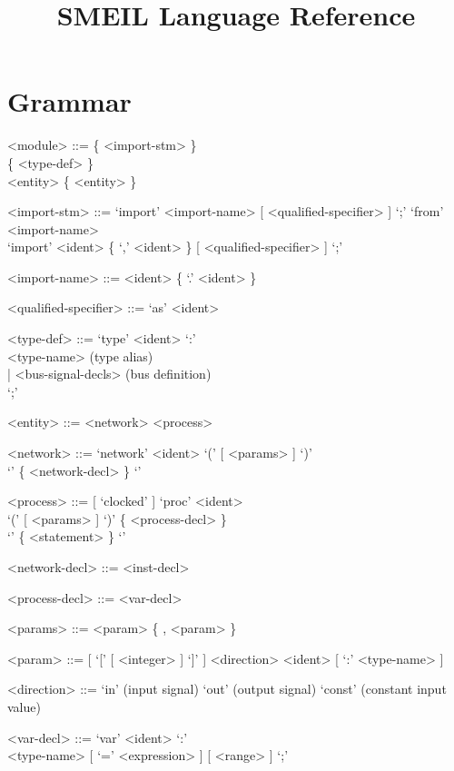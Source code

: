 \documentclass{article}
\title{SMEIL Language Reference}
\date{}
\begin{document}
\maketitle

\section*{Grammar}
\begin{grammar}
  <module> ::= \{ <import-stm> \} \\ \{ <type-def> \} \\ <entity> \{ <entity> \}

  <import-stm> ::= `import' <import-name> [ <qualified-specifier> ] `;'
  \alt `from' <import-name> \\ `import' <ident> \{ `,' <ident> \} [ <qualified-specifier> ]
  `;'

  <import-name> ::= <ident> \{ `.' <ident> \}

  <qualified-specifier> ::= `as' <ident>

  <type-def> ::= `type' <ident> `:' \\
    <type-name> (type alias) \\
    | <bus-signal-decls> (bus definition)\\
    `;' 

  <entity> ::= <network>
  \alt <process>

  <network> ::= `network' <ident> `(' [ <params> ] `)' \\`{' \{ <network-decl> \} `}'

  <process> ::= [ `clocked' ] `proc' <ident> \\ `(' [
             <params> ] `)' \{ <process-decl> \}\\ `{' \{ <statement> \} `}'

  <network-decl> ::= <inst-decl>

  <process-decl> ::= <var-decl>
  
  <params> ::= <param> \{ , <param> \}

  <param> ::= [ `[' [ <integer> ] `]' ] <direction> <ident> [ `:' <type-name> ]

  <direction> ::= `in' (input signal)
  \alt `out' (output signal)
  \alt `const' (constant input value)  

  <var-decl> ::= `var' <ident> `:' \\ <type-name> [ `=' <expression> ] [ <range> ] `;'


\end{grammar}
\end{document}
